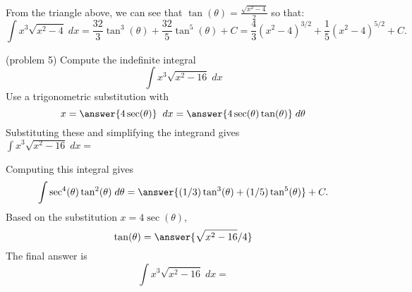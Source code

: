 \documentclass{ximera}
\begin{document}
\begin{example}[example 5]
From the triangle above, we can see that $\tan(\theta) = \frac{\sqrt{x^2-4}}{2}$ so that:
\[
\int x^3\sqrt{x^2-4} \; dx =  \frac{32}{3} \tan^3(\theta) + \frac{32}{5} \tan^5(\theta) + C =  \frac43 (x^2 - 4)^{3/2} + 
\frac{1}{5} (x^2 - 4)^{5/2} + C.
\]

\end{example}



\begin{problem}(problem 5)
Compute the indefinite integral
\[
\int   x^3 \sqrt{x^2 - 16} \; dx
\]
Use a trigonometric substitution with\\
\[
x = \answer{4\sec(\theta)} \;\; dx = \answer{4\sec(\theta)\tan(\theta)} \; d\theta
\]
Substituting these and simplifying the integrand gives\\
$\displaystyle{\int  x^3 \sqrt{ x^2 -16}\; dx =}$\\
\begin{multipleChoice}
\end{multipleChoice}

Computing this integral gives
\[
\int \sec^4(\theta)\tan^2(\theta) \; d\theta = \answer{(1/3)\tan^3(\theta)+ (1/5)\tan^5(\theta) } + C.
\]
Based on the substitution $x = 4\sec(\theta)$, \\
\[
\tan(\theta) = \answer{\sqrt{x^2 -16}/4}
\]
The final answer is
\[
\int   x^3\sqrt{x^2 -16}\; dx = 
\]

\begin{center}
\begin{multipleChoice}
\end{multipleChoice}
\end{center}


\end{problem}
\end{document}
